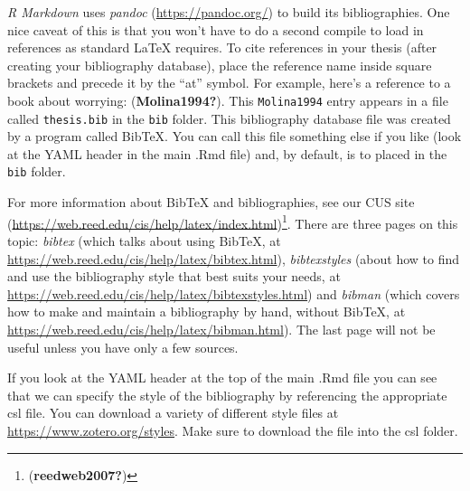 \documentclass[12pt,twoside]{reedthesis}
\begin{document}
\emph{R Markdown} uses \emph{pandoc} (\url{https://pandoc.org/}) to build its bibliographies. One nice caveat of this is that you won't have to do a second compile to load in references as standard LaTeX requires. To cite references in your thesis (after creating your bibliography database), place the reference name inside square brackets and precede it by the ``at'' symbol. For example, here's a reference to a book about worrying: (\textbf{Molina1994?}). This \texttt{Molina1994} entry appears in a file called \texttt{thesis.bib} in the \texttt{bib} folder. This bibliography database file was created by a program called BibTeX. You can call this file something else if you like (look at the YAML header in the main .Rmd file) and, by default, is to placed in the \texttt{bib} folder.

For more information about BibTeX and bibliographies, see our CUS site (\url{https://web.reed.edu/cis/help/latex/index.html})\footnote{(\textbf{reedweb2007?})}. There are three pages on this topic: \emph{bibtex} (which talks about using BibTeX, at \url{https://web.reed.edu/cis/help/latex/bibtex.html}), \emph{bibtexstyles} (about how to find and use the bibliography style that best suits your needs, at \url{https://web.reed.edu/cis/help/latex/bibtexstyles.html}) and \emph{bibman} (which covers how to make and maintain a bibliography by hand, without BibTeX, at \url{https://web.reed.edu/cis/help/latex/bibman.html}). The last page will not be useful unless you have only a few sources.

If you look at the YAML header at the top of the main .Rmd file you can see that we can specify the style of the bibliography by referencing the appropriate csl file. You can download a variety of different style files at \url{https://www.zotero.org/styles}. Make sure to download the file into the csl folder.

\vfill
\end{document}
